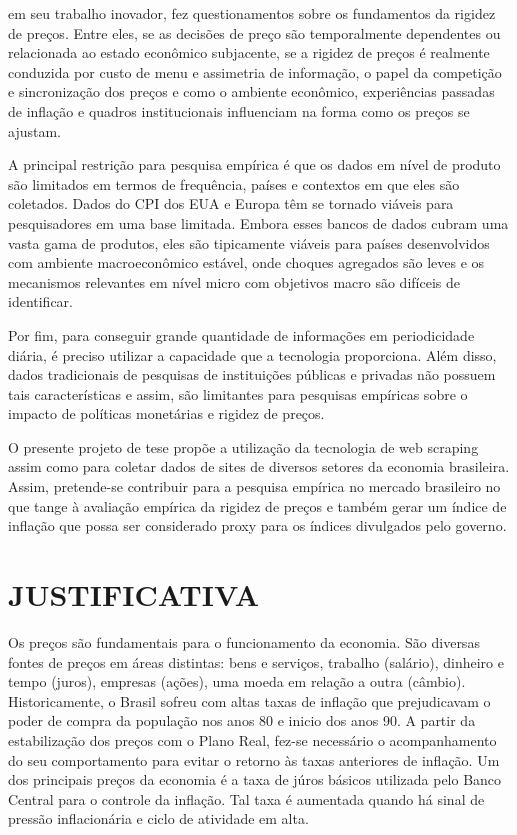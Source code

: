 \documentclass[twoside,a4paper,12pt]{report}
\begin{document}
\citet{cavallo2010scraped} em seu trabalho inovador, fez questionamentos sobre os fundamentos da rigidez de preços. Entre eles, se as decisões de preço são temporalmente dependentes ou relacionada ao estado econômico subjacente, se a rigidez de preços é realmente conduzida por custo de menu e assimetria de informação, o papel da competição e sincronização dos preços e como o ambiente econômico, experiências passadas de inflação e quadros institucionais influenciam na forma como os preços se ajustam.

A principal restrição para pesquisa empírica é que os dados em nível de produto são limitados em termos de frequência, países e contextos em que eles são coletados. Dados do CPI dos EUA e Europa têm se tornado viáveis para pesquisadores em uma base limitada. Embora esses bancos de dados cubram uma vasta gama de produtos, eles são tipicamente viáveis para países desenvolvidos com ambiente macroeconômico estável, onde choques agregados são leves e os mecanismos relevantes em nível micro com objetivos macro são difíceis de identificar. 

Por fim, para conseguir grande quantidade de informações em periodicidade diária, é preciso utilizar a capacidade que a tecnologia proporciona. Além disso, dados tradicionais de pesquisas de instituições públicas e privadas não possuem tais características e assim, são limitantes para pesquisas empíricas sobre o impacto de políticas monetárias e rigidez de preços.

O presente projeto de tese propõe a utilização da tecnologia de web scraping assim como \citet{cavallo2010scraped} para coletar dados de sites de diversos setores da economia brasileira. Assim, pretende-se contribuir para a pesquisa empírica no mercado brasileiro no que tange à avaliação empírica da rigidez de preços e também gerar um índice de inflação que possa ser considerado proxy para os índices divulgados pelo governo. 

\section*{JUSTIFICATIVA}

Os preços são fundamentais para o funcionamento da economia. São diversas fontes de preços em áreas distintas: bens e serviços, trabalho (salário), dinheiro e tempo (juros), empresas (ações), uma moeda em relação a outra (câmbio). Historicamente, o Brasil sofreu com altas taxas de inflação que prejudicavam o poder de compra da população nos anos 80 e inicio dos anos 90. A partir da estabilização dos preços com o Plano Real, fez-se necessário o acompanhamento do seu comportamento para evitar o retorno às taxas anteriores de inflação. Um dos principais preços da economia é a taxa de júros básicos utilizada pelo Banco Central para o controle da inflação. Tal taxa é aumentada quando há sinal de pressão inflacionária e ciclo de atividade em alta.
\end{document}
